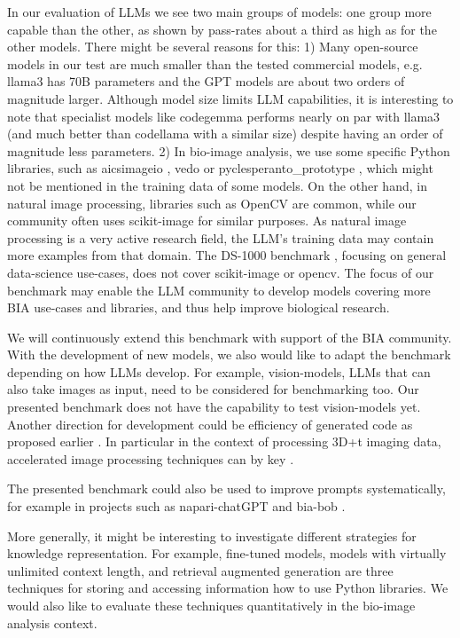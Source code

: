 \documentclass{ecai}
\begin{document}
In our evaluation of LLMs we see two main groups of models: one group more capable than the other, as shown by pass-rates about a third as high as for the other models. There might be several reasons for this: 1) Many open-source models in our test are much smaller than the tested commercial models, e.g. llama3 has 70B parameters and the GPT models are about two orders of magnitude larger. Although model size limits LLM capabilities, it is interesting to note that specialist models like codegemma performs nearly on par with llama3 (and much better than codellama with a similar size) despite having an order of magnitude less parameters. 2) In bio-image analysis, we use some specific Python libraries, such as aicsimageio \citep{aicsimageio}, vedo \citep{musy2024} or pyclesperanto\_prototype \citep{robert_haase_2023_10432619}, which might not be mentioned in the training data of some models. On the other hand, in natural image processing, libraries such as OpenCV \citep{itseez2015opencv} are common, while our community often uses scikit-image \citep{scikit-image} for similar purposes. As natural image processing is a very active research field, the LLM’s training data may contain more examples from that domain. The DS-1000 benchmark \citep{lai2022ds1000}, focusing on general data-science use-cases, does not cover scikit-image or opencv. The focus of our benchmark may enable the LLM community to develop models covering more BIA use-cases and libraries, and thus help improve biological research.

We will continuously extend this benchmark with support of the BIA community. With the development of new models, we also would like to adapt the benchmark depending on how LLMs develop. For example, vision-models, LLMs that can also take images as input, need to be considered for benchmarking too. Our presented benchmark does not have the capability to test vision-models yet. Another direction for development could be efficiency of generated code as proposed earlier \citep{du2024mercury}. In particular in the context of processing 3D+t imaging data, accelerated image processing techniques can by key \citep{Haase2020}. 
\begin{blind}
The presented benchmark could also be used to improve prompts systematically, for example in projects such as napari-chatGPT \citep{royer2023omega} and bia-bob \citep{haase2024biaBob}.
\end{blind} 
More generally, it might be interesting to investigate different strategies for knowledge representation. For example, fine-tuned models, models with virtually unlimited context length, and retrieval augmented generation are three techniques for storing and accessing information how to use Python libraries. We would also like to evaluate these techniques quantitatively in the bio-image analysis context.
\end{document}
